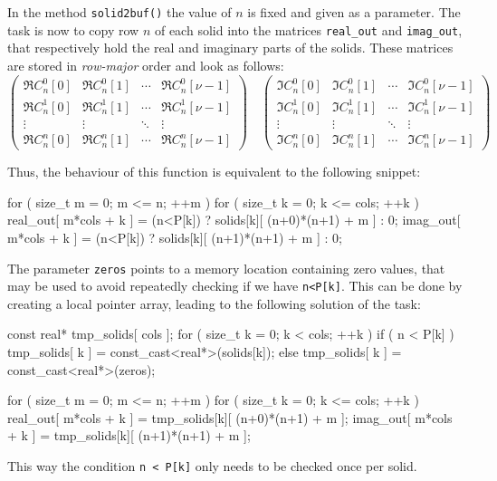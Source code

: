\documentclass{scrbook}
\begin{document}
In the method \lstinline|solid2buf()| the value of $n$ is fixed and given
as a parameter. The task is now to copy row $n$ of each solid into the matrices
\lstinline|real_out| and \lstinline|imag_out|, that respectively hold the real
and imaginary parts of the solids. These matrices are stored in \emph{row-major}
order and look as follows:
\begin{equation}
\begin{pmatrix}
\Re C_n^0[0] & \Re C_n^0[1] & \cdots & \Re C_n^0[\nu-1] \\
\Re C_n^1[0] & \Re C_n^1[1] & \cdots & \Re C_n^1[\nu-1] \\
\vdots       & \vdots       & \ddots & \vdots           \\ 
\Re C_n^n[0] & \Re C_n^n[1] & \cdots & \Re C_n^n[\nu-1]
\end{pmatrix}
\quad
\begin{pmatrix}
\Im C_n^0[0] & \Im C_n^0[1] & \cdots & \Im C_n^0[\nu-1] \\
\Im C_n^1[0] & \Im C_n^1[1] & \cdots & \Im C_n^1[\nu-1] \\
\vdots       & \vdots       & \ddots & \vdots           \\ 
\Im C_n^n[0] & \Im C_n^n[1] & \cdots & \Im C_n^n[\nu-1]
\end{pmatrix}
\end{equation}

Thus, the behaviour of this function is equivalent to the following snippet:
\begin{cppcode*}
for ( size_t m = 0; m <= n;    ++m )
for ( size_t k = 0; k <= cols; ++k )
{
    real_out[ m*cols + k ] = (n<P[k]) ? solids[k][ (n+0)*(n+1) + m ] : 0;
    imag_out[ m*cols + k ] = (n<P[k]) ? solids[k][ (n+1)*(n+1) + m ] : 0;
}
\end{cppcode*}

The parameter \lstinline|zeros| points to a memory location containing zero
values, that may be used to avoid repeatedly checking if we have
\lstinline|n<P[k]|. This can be done by creating a local pointer array, leading
to the following solution of the task:
\begin{cppcode*}
const real* tmp_solids[ cols ];
for ( size_t k = 0; k < cols; ++k )
{
    if ( n < P[k] )
        tmp_solids[ k ] = const_cast<real*>(solids[k]);
    else
        tmp_solids[ k ] = const_cast<real*>(zeros);
}

for ( size_t m = 0; m <= n;    ++m )
for ( size_t k = 0; k <= cols; ++k )
{
    real_out[ m*cols + k ] = tmp_solids[k][ (n+0)*(n+1) + m ];
    imag_out[ m*cols + k ] = tmp_solids[k][ (n+1)*(n+1) + m ];
}
\end{cppcode*}
This way the condition \lstinline|n < P[k]| only needs to be checked once per
solid.
\end{document}
